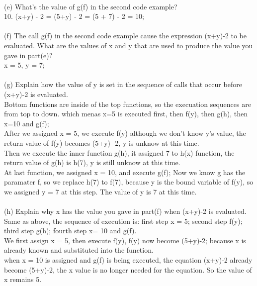 \documentclass[12pt]{article}
\begin{document}
\vspace{1mm}\\
(e) What's the value of g(f) in the second code example?\\
10. \indent\indent(x+y) - 2 = (5+y) - 2 = (5 + 7) - 2 = 10;\\
\vspace{1mm}\\
(f) The call g(f) in the second code example cause the expression (x+y)-2 to be evaluated. What are the values of x and y that are used to produce the value you gave in part(e)?\\
x = 5, y = 7;\\
\vspace{1mm}\\
(g) Explain how the value of y is set in the sequence of calls that occur before (x+y)-2 is evaluated.\\
Bottom functions are inside of the top functions, so the execuation sequences are from top to down. which menas x=5 is executed first, then f(y), then g(h), then x=10 and g(f);\\
After we assigned x = 5, we execute f(y) although we don't know y's value, the return value of f(y) becomes (5+y) -2, y is unknow at this time. \\
Then we execute the inner function g(h), it assigned 7 to h(x) function, the return value of g(h) is h(7), y is still unknow at this time.\\ At last function, we assigned x = 10, and execute g(f); Now we know g has the paramater f, so we replace h(7) to f(7), because y is the bound variable of f(y), so we assigned y = 7 at this step. The value of y is 7 at this time.\\
\vspace{1mm}\\
(h) Explain why x has the value you gave in part(f) when (x+y)-2 is evaluated.\\
Same as above, the sequence of execution is: first step x = 5; second step f(y); third step g(h); fourth step x= 10 and g(f).\\
We first assign x = 5, then execute f(y), f(y) now become (5+y)-2; because x is already known and substituted into the function.\\
when x = 10 is assigned and g(f) is being executed, the equation (x+y)-2 already become (5+y)-2, the x value is no longer needed for the equation. So the value of x remains 5.
\end{document}
